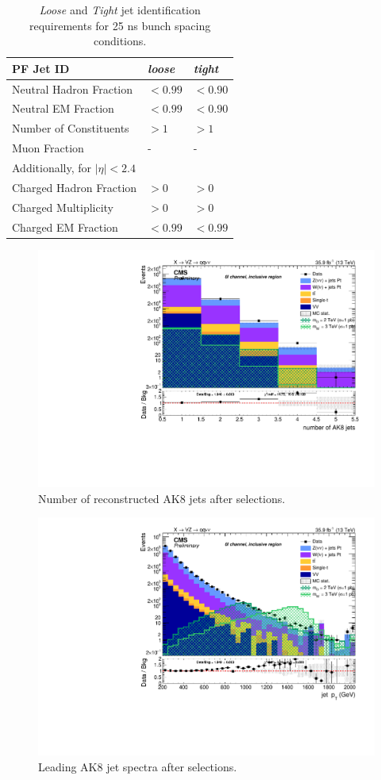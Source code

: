 \begin{table}[htb]
 \centering
 \begin{tabular}{lll}
\hline
PF Jet ID                       & \emph{loose}   & \emph{tight}   \\
\hline
 \hline
Neutral Hadron Fraction         & $< 0.99  $     & $< 0.90  $    \\
Neutral EM Fraction             & $< 0.99  $     & $< 0.90  $\\
Number of Constituents          & $> 1     $     & $> 1     $\\
Muon Fraction                   & \--            & \-- \\
\hline
\multicolumn{3}{l}{Additionally, for $|\eta| < 2.4$ } \\
\hline
Charged Hadron Fraction         & $> 0   $& $> 0   $\\
Charged Multiplicity            & $> 0   $& $> 0   $\\
Charged EM Fraction             & $< 0.99$& $< 0.99$\\
\hline
 \end{tabular}
 \caption{ \emph{Loose} and \emph{Tight} jet identification requirements for 25 ns bunch spacing conditions.\label{tab:JetId}}
\end{table}

\begin{figure}[!htb]
  \begin{center}
    \includegraphics[width=.495\textwidth]{plots/v9_U/XVZnnInc/nFatJets.pdf}
  \end{center}
  \caption{Number of reconstructed AK8 jets after selections.}
  \label{fig:n_AK8}
\end{figure}

\begin{figure}[!htb]
  \begin{center}
    \includegraphics[width=.495\textwidth]{plots/v9_U/XVZnnInc/FatJet1_pt.pdf}
  \end{center}
  \caption{Leading AK8 jet \pt spectra after selections.}
  \label{fig:AK8jet_pt}
\end{figure}

